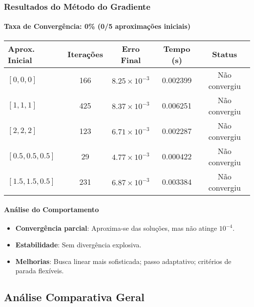 \documentclass[12pt,a4paper]{article}
\begin{document}
\subsubsection{Resultados do Método do Gradiente}
\paragraph{Taxa de Convergência: 0\% (0/5 aproximações iniciais)}
\begin{table}[H]
\centering
\begin{tabular}{lcccc}
\hline
\textbf{Aprox. Inicial} & \textbf{Iterações} & \textbf{Erro Final} & \textbf{Tempo (s)} & \textbf{Status} \\
\hline
$[0,0,0]$ & 166 & $8.25\times 10^{-3}$ & 0.002399 & Não convergiu \\
$[1,1,1]$ & 425 & $8.37\times 10^{-3}$ & 0.006251 & Não convergiu \\
$[2,2,2]$ & 123 & $6.71\times 10^{-3}$ & 0.002287 & Não convergiu \\
$[0.5,0.5,0.5]$ & 29 & $4.77\times 10^{-3}$ & 0.000422 & Não convergiu \\
$[1.5,1.5,0.5]$ & 231 & $6.87\times 10^{-3}$ & 0.003384 & Não convergiu \\
\hline
\end{tabular}
\end{table}

\paragraph{Análise do Comportamento}
\begin{itemize}
    \item \textbf{Convergência parcial}: Aproxima-se das soluções, mas não atinge $10^{-4}$.
    \item \textbf{Estabilidade}: Sem divergência explosiva.
    \item \textbf{Melhorias}: Busca linear mais sofisticada; passo adaptativo; critérios de parada flexíveis.
\end{itemize}

\subsection{Análise Comparativa Geral}
\end{document}
